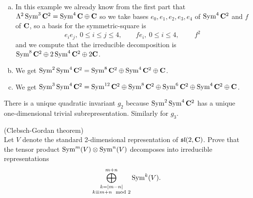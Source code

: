 \documentclass[12pt]{article}
\begin{document}
\begin{answer}
\begin{enumerate}[(a)]
\item In this example we already know from the first part that $\Lambda^2\operatorname{Sym}^3\mathbf{C}^2=\operatorname{Sym}^4\mathbf{C}\oplus\mathbf{C}$ so we take bases $e_0,e_1,e_2,e_3,e_4$ of $\operatorname{Sym}^4\mathbf{C}^2$ and $f$ of $\mathbf{C}$, so a basis for the symmetric-square is
\[e_ie_j,\ 0\leq i\leq j\leq 4,\qquad fe_i,\ 0\leq i\leq 4,\ \qquad f^2\]
and we compute that the irreducible decomposition is $\operatorname{Sym}^8\mathbf{C}^2\oplus 2\operatorname{Sym}^4\mathbf{C}^2\oplus2\mathbf{C}$.
\item We get $\operatorname{Sym}^2\operatorname{Sym}^4\mathbf{C}^2=\operatorname{Sym}^8\mathbf{C}^2\oplus\operatorname{Sym}^4\mathbf{C}^2\oplus\mathbf{C}$.
\item We get $\operatorname{Sym}^3\operatorname{Sym}^4\mathbf{C}^2=\operatorname{Sym}^{12}\mathbf{C}^2\oplus\operatorname{Sym}^8\mathbf{C}^2\oplus\operatorname{Sym}^6\mathbf{C}^2\oplus\operatorname{Sym}^4\mathbf{C}^2\oplus\mathbf{C}$.
\end{enumerate}
There is a unique quadratic invariant $g_2$ because $\operatorname{Sym}^2\operatorname{Sym}^4\mathbf{C}^2$ has a unique one-dimensional trivial subrepresentation. Similarly for $g_3$.
\end{answer}
\newpage
\fi

\bigskip

\begin{question}(Clebsch-Gordan theorem)\\
Let $V$ denote the standard 2-dimensional representation of $\mathfrak{sl}(2,\mathbf{C})$. Prove that the tensor product $\operatorname{Sym}^m(V)\otimes\operatorname{Sym}^n(V)$ decomposes into irreducible representations
\[\bigoplus_{\substack{k=|m-n|\\k\equiv m+n\mod 2}}^{m+n}\operatorname{Sym}^k(V).\]
\end{question}
\end{document}

